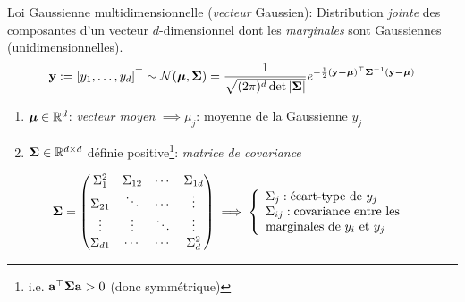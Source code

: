 \documentclass[xcolor=svgnames, t]{beamer}
\newcommand{\vectorx}[1]{\boldsymbol{\MakeLowercase{\mathbf{#1}}}}
\newcommand{\matrixx}[1]{\boldsymbol{\MakeUppercase{#1}}}
\newcommand{\coloredemph}[1]{\textcolor{internationalblue}{\emph{#1}}}
\begin{document}
\begin{frame}{\subsecname}
  

  Loi Gaussienne multidimensionnelle (\coloredemph{vecteur} Gaussien): Distribution \coloredemph{jointe} des composantes d'un vecteur $d$-dimensionnel dont les \coloredemph{marginales} sont Gaussiennes (unidimensionnelles).
  \begin{equation*}
    \vectorx{Y} := [ y_1, \dots, y_d ]^\top  \sim \mathcal{N}(\vectorx{\mu} , \matrixx{\Sigma}) =  \frac{1}{\sqrt{(2 \pi)^d \det |\matrixx{\Sigma}|}} e^{-\frac{1}{2}(\vectorx{y - \mu})^\top \matrixx{\Sigma}^{-1} (\vectorx{y - \mu})}
  \end{equation*}
% 
  \begin{enumerate}
    \item $\vectorx{\mu} \in \mathbb{R}^d$: \coloredemph{vecteur moyen} $\implies \mu_j$: moyenne de la Gaussienne $y_j$
    \item $\matrixx{\Sigma} \in \mathbb{R}^{d \times d}$ définie positive\footnote{i.e. $\vectorx{a}^\top \matrixx{\Sigma} \vectorx{a} > 0$ (donc symmétrique)}: \coloredemph{matrice de covariance}
  \end{enumerate}
% 
  \pause
  \begin{equation*}
    \matrixx{\Sigma}
    =
    \begin{pmatrix} 
      \Sigma^2_{1}  & \Sigma_{{1}{2}} &  \cdots & \Sigma_{{1}{d}} \\
      \Sigma_{{2}{1}} & \ddots          & \cdots  & \vdots \\
      \vdots          & \vdots          & \ddots  & \vdots \\
      \Sigma_{{d}{1}} & \cdots          & \cdots  &  \Sigma^2_{d} 
      \end{pmatrix}
    \implies
    \left\{
      \begin{array}{ll}
        \Sigma_j  : \text{écart-type} \text{ de } y_j\\
        \Sigma_{ij} : \text{covariance entre les } \\
        \text{marginales de } y_i \text{ et } y_j
      \end{array}
    \right.
  \end{equation*}
\end{frame}
\end{document}
